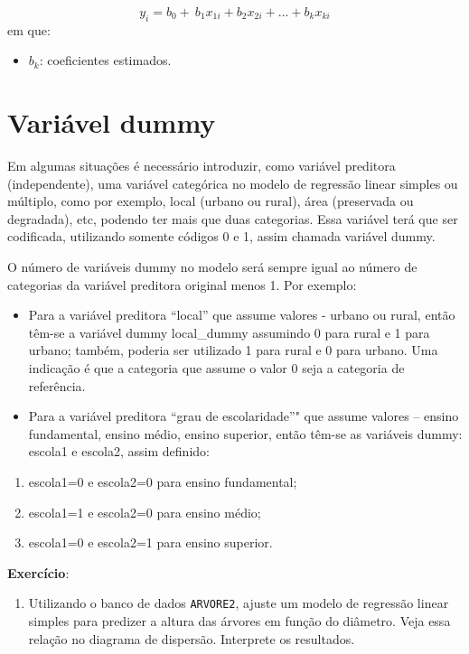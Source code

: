 \documentclass[12pt,brazil,oneside]{book}
\providecommand{\tightlist}{%
  \setlength{\itemsep}{0pt}\setlength{\parskip}{0pt}}
\begin{document}
\[ 
y_{i} = b_0+\ b_1x_{1i}+b_2x_{2i}+\dots+b_kx_{ki} 
\]
em que:

\begin{itemize}
\tightlist
\item
  \(b_k\): coeficientes estimados.
\end{itemize}

\hypertarget{variavel-dummy}{%
\section{Variável dummy}\label{variavel-dummy}}

Em algumas situações é necessário introduzir, como variável preditora (independente), uma variável categórica no
modelo de regressão linear simples ou múltiplo, como por exemplo, local (urbano ou rural), área (preservada ou degradada), etc, podendo ter mais que duas categorias. Essa variável terá que ser codificada, utilizando somente códigos 0 e 1, assim chamada variável dummy.

O número de variáveis dummy no modelo será sempre igual ao número de categorias da variável preditora original
menos 1. Por exemplo:

\begin{itemize}
\item
  Para a variável preditora ``local'' que assume valores - urbano ou rural, então têm-se a variável dummy
  local\_dummy assumindo 0 para rural e 1 para urbano; também, poderia ser utilizado 1 para rural e 0 para
  urbano. Uma indicação é que a categoria que assume o valor 0 seja a categoria de referência.
\item
  Para a variável preditora ``grau de escolaridade''" que assume valores -- ensino fundamental, ensino médio,
  ensino superior, então têm-se as variáveis dummy: escola1 e escola2, assim definido:
\end{itemize}

\begin{enumerate}
\def\labelenumi{\alph{enumi}.}
\tightlist
\item
  escola1=0 e escola2=0 para ensino fundamental;
\item
  escola1=1 e escola2=0 para ensino médio;
\item
  escola1=0 e escola2=1 para ensino superior.
\end{enumerate}

\textbf{Exercício}:

\begin{enumerate}
\def\labelenumi{\arabic{enumi})}
\tightlist
\item
  Utilizando o banco de dados \texttt{ARVORE2}, ajuste um modelo de regressão linear simples para predizer a altura das árvores
  em função do diâmetro. Veja essa relação no diagrama de dispersão. Interprete os resultados.
\end{enumerate}
\end{document}
